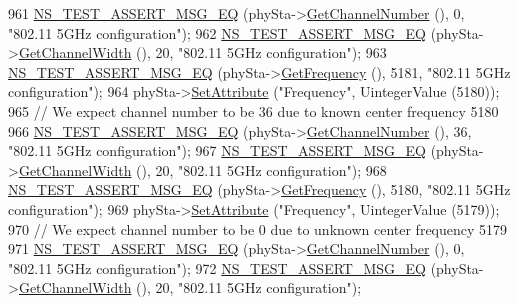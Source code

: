 \begin{DoxyCode}
961     \hyperlink{group__testing_ga2a9d78cffb3db8e867c35fff0b698cf5}{NS\_TEST\_ASSERT\_MSG\_EQ} (phySta->\hyperlink{classns3_1_1WifiPhy_a5cf0ccf06109ace61db51c83e91b7e8d}{GetChannelNumber} (), 0, \textcolor{stringliteral}{"802.11
       5GHz configuration"});
962     \hyperlink{group__testing_ga2a9d78cffb3db8e867c35fff0b698cf5}{NS\_TEST\_ASSERT\_MSG\_EQ} (phySta->\hyperlink{classns3_1_1WifiPhy_a4a5d5009b3b3308f2baeed42a2007189}{GetChannelWidth} (), 20, \textcolor{stringliteral}{"802.11 5GHz
       configuration"});
963     \hyperlink{group__testing_ga2a9d78cffb3db8e867c35fff0b698cf5}{NS\_TEST\_ASSERT\_MSG\_EQ} (phySta->\hyperlink{classns3_1_1WifiPhy_ad2508d94faf22d690d6b8b4367934fd1}{GetFrequency} (), 5181, \textcolor{stringliteral}{"802.11 5GHz
       configuration"});
964     phySta->\hyperlink{classns3_1_1ObjectBase_ac60245d3ea4123bbc9b1d391f1f6592f}{SetAttribute} (\textcolor{stringliteral}{"Frequency"}, UintegerValue (5180));
965     \textcolor{comment}{// We expect channel number to be 36 due to known center frequency 5180}
966     \hyperlink{group__testing_ga2a9d78cffb3db8e867c35fff0b698cf5}{NS\_TEST\_ASSERT\_MSG\_EQ} (phySta->\hyperlink{classns3_1_1WifiPhy_a5cf0ccf06109ace61db51c83e91b7e8d}{GetChannelNumber} (), 36, \textcolor{stringliteral}{"802.11
       5GHz configuration"});
967     \hyperlink{group__testing_ga2a9d78cffb3db8e867c35fff0b698cf5}{NS\_TEST\_ASSERT\_MSG\_EQ} (phySta->\hyperlink{classns3_1_1WifiPhy_a4a5d5009b3b3308f2baeed42a2007189}{GetChannelWidth} (), 20, \textcolor{stringliteral}{"802.11 5GHz
       configuration"});
968     \hyperlink{group__testing_ga2a9d78cffb3db8e867c35fff0b698cf5}{NS\_TEST\_ASSERT\_MSG\_EQ} (phySta->\hyperlink{classns3_1_1WifiPhy_ad2508d94faf22d690d6b8b4367934fd1}{GetFrequency} (), 5180, \textcolor{stringliteral}{"802.11 5GHz
       configuration"});
969     phySta->\hyperlink{classns3_1_1ObjectBase_ac60245d3ea4123bbc9b1d391f1f6592f}{SetAttribute} (\textcolor{stringliteral}{"Frequency"}, UintegerValue (5179));
970     \textcolor{comment}{// We expect channel number to be 0 due to unknown center frequency 5179}
971     \hyperlink{group__testing_ga2a9d78cffb3db8e867c35fff0b698cf5}{NS\_TEST\_ASSERT\_MSG\_EQ} (phySta->\hyperlink{classns3_1_1WifiPhy_a5cf0ccf06109ace61db51c83e91b7e8d}{GetChannelNumber} (), 0, \textcolor{stringliteral}{"802.11
       5GHz configuration"});
972     \hyperlink{group__testing_ga2a9d78cffb3db8e867c35fff0b698cf5}{NS\_TEST\_ASSERT\_MSG\_EQ} (phySta->\hyperlink{classns3_1_1WifiPhy_a4a5d5009b3b3308f2baeed42a2007189}{GetChannelWidth} (), 20, \textcolor{stringliteral}{"802.11 5GHz
       configuration"});

\end{DoxyCode}
